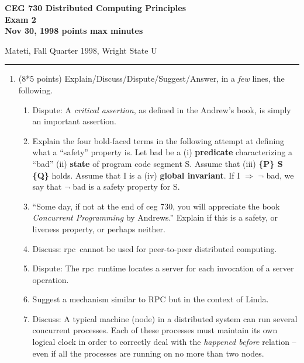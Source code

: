 \documentclass[12pt]{article}
\def\RPC{{\sc rpc}}
\def\zimplies{\Rightarrow}
\begin{document}
{\bf CEG
\Large 730 Distributed Computing Principles\\[5pt]
\large Exam 2\\[5pt]
Nov 30, 1998  points max  minutes\\
}

\bigskip
{\large Mateti,  Fall Quarter 1998, Wright State U}\\[-5pt]
\hrule

\begin{enumerate}

\item (8*5 points)
Explain/Discuss/Dispute/Suggest/Answer, in a {\em few} lines, the following.

\begin{enumerate}
\item Dispute:
A {\em critical assertion}, as defined in the Andrew's book, is
simply an important assertion.

\item Explain the four bold-faced terms in the following attempt at
defining what a ``safety'' property is.  Let {\sc bad} be a (i) {\bf
predicate} characterizing a ``bad'' (ii) {\bf state} of program code
segment S.  Assume that (iii) {\bf \{P\} S \{Q\}} holds.  Assume that
I is a (iv) {\bf global invariant}.  If I $\zimplies$ $\neg$ {\sc
bad}, we say that $\neg$ {\sc bad} is a safety property for S.

\item
``Some day, if not at the end of {\sc ceg} 730, you will appreciate the
book {\em Concurrent Programming} by Andrews.''  Explain if this is a
safety, or liveness property, or perhaps neither.

\item
Discuss:
\RPC\ cannot be used for peer-to-peer distributed computing.

\item
Dispute: The \RPC\ runtime locates a server for each invocation
of a server operation.

\item
Suggest a mechanism similar to RPC but in the context of Linda.


\item
Discuss:
A typical machine (node) in a distributed system can run several
concurrent processes.  Each of these processes must maintain its own
logical clock in order to correctly deal with the {\em happened
before} relation -- even if all the processes are running
on no more than two nodes.


\end{enumerate}
\end{enumerate}
\end{document}
